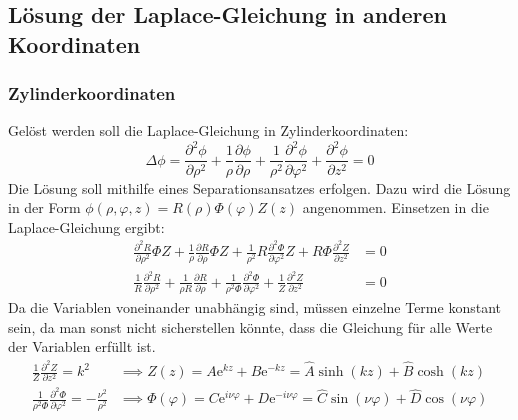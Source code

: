    \subsection{Lösung der Laplace-Gleichung in anderen Koordinaten}\label{laplkoord}
   \subsubsection{Zylinderkoordinaten}
   Gelöst werden soll die Laplace-Gleichung in Zylinderkoordinaten:
   \begin{equation}
   	\Delta \phi = \frac{\partial^2 \phi}{\partial \rho^2} + \frac{1}{\rho} \frac{\partial \phi}{\partial \rho} + \frac{1}{\rho^2} \frac{\partial^2 \phi}{\partial \varphi^2} + \frac{\partial^2 \phi}{\partial z^2} = 0
   \end{equation}
   Die Lösung soll mithilfe eines Separationsansatzes erfolgen. Dazu wird die Lösung in der Form $\phi(\rho, \varphi, z) = R(\rho) \Phi(\varphi) Z(z)$ angenommen. Einsetzen in die Laplace-Gleichung ergibt:
   \begin{equation}\begin{split}
   		\frac{\partial^2 R}{\partial \rho^2}\Phi Z + \frac{1}{\rho} \frac{\partial R}{\partial \rho} \Phi Z + \frac{1}{\rho^2} R \frac{\partial^2 \Phi}{\partial \varphi^2} Z + R \Phi \frac{\partial^2 Z}{\partial z^2} &= 0\\
   		\frac{1}{R} \frac{\partial^2 R}{\partial \rho^2} + \frac{1}{\rho R} \frac{\partial R}{\partial \rho} + \frac{1}{\rho^2 \Phi} \frac{\partial^2 \Phi}{\partial \varphi^2} + \frac{1}{Z} \frac{\partial^2 Z}{\partial z^2} &= 0
   \end{split}\end{equation}
   Da die Variablen voneinander unabhängig sind, müssen einzelne Terme konstant sein, da man sonst nicht sicherstellen könnte, dass die Gleichung für alle Werte der Variablen erfüllt ist.
   \begin{equation} \begin{split}
   		\frac{1}{Z} \frac{\partial^2 Z}{\partial z^2} = k^2 &\implies Z(z)=A \mathrm{e}^{kz} + B \mathrm{e}^{-kz}=\hat{A} \sinh(kz) + \hat{B} \cosh(kz)\\
   		\frac{1}{\rho^2 \Phi} \frac{\partial^2 \Phi}{\partial \varphi^2} = - \frac{\nu^2}{\rho^2} &\implies \Phi(\varphi) = C \mathrm{e}^{i \nu \varphi} + D \mathrm{e}^{-i \nu \varphi} = \hat{C} \sin(\nu \varphi) + \hat{D} \cos(\nu \varphi)
   	\end{split}
   \end{equation}
